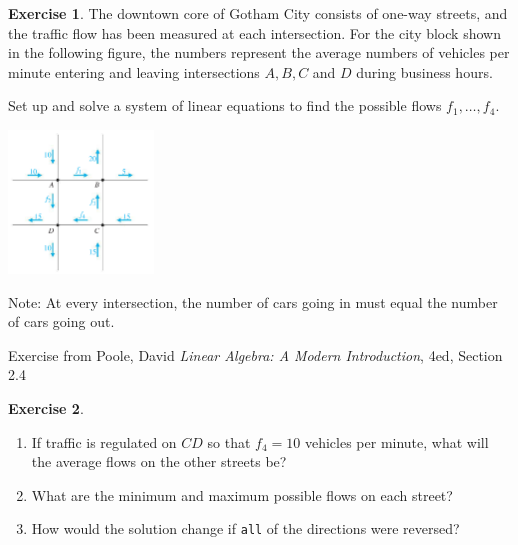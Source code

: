 \documentclass[handout]{beamer}
\theoremstyle{definition}
\newtheorem{exercise}{Exercise}
\renewcommand{\emph}[1]{{\color{blue}\texttt{#1}}}
\begin{document}
\begin{frame}{\insertframenumber}
	\begin{exercise}
		The downtown core of Gotham City consists of one-way streets, and the traffic flow has been measured at each intersection.  For the city block shown in the following figure, the numbers represent the average numbers of vehicles per minute entering and leaving intersections $A,B,C$ and $D$ during business hours.
		
		Set up and solve a system of linear equations to find the possible flows $f_1,\dots,f_4$.
		
	\begin{minipage}{.5\textwidth}
		\begin{center}
		\includegraphics[height = 1.5in]{images/Gotham}
		\end{center}
	\end{minipage}
	\begin{minipage}{.4\textwidth}
	Note: At every intersection, the number of cars going in must equal the number of cars going out.
	\end{minipage}
	\end{exercise}
	{\tiny Exercise from Poole, David \textit{Linear Algebra: A Modern Introduction}, 4ed, Section 2.4}
\end{frame}

\begin{frame}{\insertframenumber}
	\begin{exercise}
		\begin{enumerate}[label=(\alph*)]
			\item If traffic is regulated on $CD$ so that $f_4=10$ vehicles per minute, what will the average flows on the other streets be?\pause
			\item What are the minimum and maximum possible flows on each street?\pause
			\item How would the solution change if \emph{all} of the directions were reversed?
		\end{enumerate}
	\end{exercise}
\end{frame}
\end{document}
